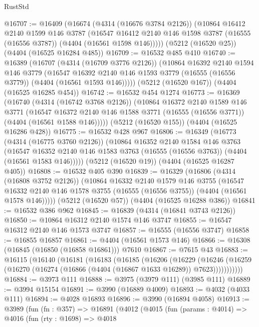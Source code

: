 \begin{lexlean}{RustStd}
\begin{coremodule}
@16707 := @16409
    (@16674
      (@4314 (@16676 @3784 @2126))
      (@10864
        @16412
        @2140
        @1599
        @146
        @3787
        (@16547 @16412 @2140 @146 @1598 @3787 (@16555 (@16556 @3787)) (@4404 (@16561 @1598 @146)))))
    (@5212 (@16520 @25))
    (@4404 (@16525 @16284 @485))
@16709 := @16532 @485 @410
@16740 := @16389
    (@16707
      (@4314 (@16709 @3776 @2126))
      (@10864
        @16392
        @2140
        @1594
        @146
        @3779
        (@16547 @16392 @2140 @146 @1593 @3779 (@16555 (@16556 @3779)) (@4404 (@16561 @1593 @146)))))
    (@5212 (@16520 @167))
    (@4404 (@16525 @16285 @454))
@16742 := @16532 @454 @1274
@16773 := @16369
    (@16740
      (@4314 (@16742 @3768 @2126))
      (@10864
        @16372
        @2140
        @1589
        @146
        @3771
        (@16547 @16372 @2140 @146 @1588 @3771 (@16555 (@16556 @3771)) (@4404 (@16561 @1588 @146)))))
    (@5212 (@16520 @155))
    (@4404 (@16525 @16286 @428))
@16775 := @16532 @428 @967
@16806 := @16349
    (@16773
      (@4314 (@16775 @3760 @2126))
      (@10864
        @16352
        @2140
        @1584
        @146
        @3763
        (@16547 @16352 @2140 @146 @1583 @3763 (@16555 (@16556 @3763)) (@4404 (@16561 @1583 @146)))))
    (@5212 (@16520 @19))
    (@4404 (@16525 @16287 @405))
@16808 := @16532 @405 @390
@16839 := @16329
    (@16806
      (@4314 (@16808 @3752 @2126))
      (@10864
        @16332
        @2140
        @1579
        @146
        @3755
        (@16547 @16332 @2140 @146 @1578 @3755 (@16555 (@16556 @3755)) (@4404 (@16561 @1578 @146)))))
    (@5212 (@16520 @57))
    (@4404 (@16525 @16288 @386))
@16841 := @16532 @386 @962
@16845 := @16839 (@4314 (@16841 @3743 @2126))
@16850 := @10864 @16312 @2140 @1574 @146 @3747
@16855 := @16547 @16312 @2140 @146 @1573 @3747
@16857 := @16555 (@16556 @3747)
@16858 := @16855 @16857
@16861 := @4404 (@16561 @1573 @146)
@16866 := @16308 (@16845 (@16850 (@16858 @16861))) @7610
@16867 := @7615 @43
@16883 := @16115
    (@16140
      (@16181
        (@16183
          (@16185
            (@16206
              (@16229
                (@16246
                  (@16259 (@16270 (@16274 (@16866 (@4404 (@16867 @1633 @16289)) @7623)))))))))))
@16884 := @3973 @111
@16888 := @3975 (@3979 @111) (@3985 @111)
@16889 := @3994 @15154
@16891 := @3990 (@16889 @4009)
@16893 := @4032 (@4033 @111)
@16894 := @4028 @16893
@16896 := @3990 (@16894 @4058)
@16913 := @3989
    (fun (fn : @357) =>
    @16891
      (@4012
        (@4015
          (fun (params : @4014) =>
          @4016
            (fun (rty : @1698) =>
            @4018

\end{coremodule}
\end{lexlean}
